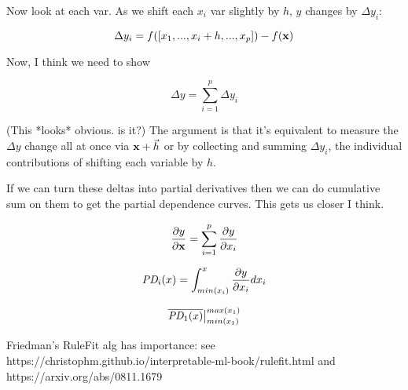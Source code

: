 \documentclass[12pt]{article}
\newcommand{\cut}[1]{}
\begin{document}
Now look at each var. As we shift each $x_i$ var slightly by $h$, $y$ changes by $\Delta y_i$:

\[
\Delta y_i = f([x_1, ..., x_i+h, ..., x_p]) - f({\bf x})
\]

Now, I think we need to show

\[
\Delta y = \sum_{i=1}^{p} \Delta y_i
\]

(This *looks* obvious. is it?) The argument is that it's equivalent to measure the $\Delta y$ change all at once via ${\bf x} + \vec{h}$ or by collecting and summing $\Delta y_i$, the individual contributions of shifting each variable by $h$.  

If we can turn these deltas into partial derivatives then we can do cumulative sum on them to get the partial dependence curves. This gets us closer I think.


\[
\frac{\partial y}{\partial \bf x} = \sum_{i=1}^p \frac{\partial y}{\partial x_i}
\]

\[
\text{\it PD}_i(x) = \int_{min(x_i)}^x \frac{\partial y}{\partial x_i} dx_i
\]

\[
\overline{\text{\it PD}_1(x)}\big |_{min(x_1)}^{max(x_1)}
\]

\cut{
\noindent At $x_i$ for some $h$ (maybe $h$ is instance index).

Define the gradient:

\[
\nabla {\bf x} = [\frac{\partial y}{\partial x_1}, \ldots, \frac{\partial y}{\partial x_p}]
\]

When we move from ${\bf x}$ to ${\bf x}+\nabla {\bf x}$, we add some $\Delta y$ to $y$ so

\[
f({\bf x}+\nabla {\bf x}) = y + \Delta y 
\]

I think we need to show

\[
\Delta y_i = \frac{f(x_i + h) - f(x_i)}{h}
\]

\[
\Delta y = \sum_{i=1}^{p} \Delta y_i
\]
}

Friedman's RuleFit alg has importance: see https://christophm.github.io/interpretable-ml-book/rulefit.html and https://arxiv.org/abs/0811.1679




\end{document}
